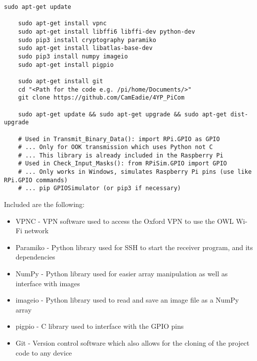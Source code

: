 \documentclass[../main.tex]{subfiles}
\begin{document}
\lstset{style=python}
\begin{lstlisting}[caption=Libraries and Packages Required for the Test Bed]
	sudo apt-get update
	
	sudo apt-get install vpnc
	sudo apt-get install libffi6 libffi-dev python-dev
	sudo pip3 install cryptography paramiko
	sudo apt-get install libatlas-base-dev
	sudo pip3 install numpy imageio
	sudo apt-get install pigpio
	
	sudo apt-get install git
	cd "<Path for the code e.g. /pi/home/Documents/>"
	git clone https://github.com/CamEadie/4YP_PiCom
	
	sudo apt-get update && sudo apt-get upgrade && sudo apt-get dist-upgrade

	# Used in Transmit_Binary_Data(): import RPi.GPIO as GPIO
	# ... Only for OOK transmission which uses Python not C
	# ... This library is already included in the Raspberry Pi
	# Used in Check_Input_Masks(): from RPiSim.GPIO import GPIO
	# ... Only works in Windows, simulates Raspberry Pi pins (use like RPi.GPIO commands)
	# ... pip GPIOSimulator (or pip3 if necessary)  
\end{lstlisting}

Included are the following:

\begin{itemize}
	\item VPNC - VPN software used to access the Oxford VPN to use the OWL Wi-Fi network
	\item Paramiko - Python library used for SSH to start the receiver program, and its dependencies
	\item NumPy - Python library used for easier array manipulation as well as interface with images
	\item imageio - Python library used to read and save an image file as a NumPy array
	\item pigpio - C library used to interface with the GPIO pins
	\item Git - Version control software which also allows for the cloning of the project code to any device
\end{itemize}

\clearpage

	
\end{document}
